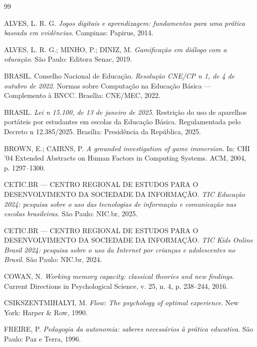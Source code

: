 \documentclass[11pt,a4paper]{article}
\begin{document}
\begin{thebibliography}{99}
\small

ALVES, L. R. G.
\emph{Jogos digitais e aprendizagem: fundamentos para uma pr\'atica baseada em evid\^encias}.
Campinas: Papirus, 2014.

ALVES, L. R. G.; MINHO, P.; DINIZ, M.
\emph{Gamifica\c{c}\~ao em di\'alogo com a educa\c{c}\~ao}.
S\~ao Paulo: Editora Senac, 2019.

BRASIL. Conselho Nacional de Educa\c{c}\~ao.
\emph{Resolu\c{c}\~ao CNE/CP n\textordmasculine{} 1, de 4 de outubro de 2022}. Normas sobre Computa\c{c}\~ao na Educa\c{c}\~ao B\'asica --- Complemento \`a BNCC.
Bras\'ilia: CNE/MEC, 2022.

BRASIL.
\emph{Lei n\textordmasculine{} 15.100, de 13 de janeiro de 2025}. Restri\c{c}\~ao do uso de aparelhos port\'ateis por estudantes em escolas da Educa\c{c}\~ao B\'asica. Regulamentada pelo Decreto n\textordmasculine{} 12.385/2025.
Bras\'ilia: Presid\^encia da Rep\'ublica, 2025.

BROWN, E.; CAIRNS, P.
\emph{A grounded investigation of game immersion}.
In: CHI '04 Extended Abstracts on Human Factors in Computing Systems. ACM, 2004, p. 1297--1300.

CETIC.BR --- CENTRO REGIONAL DE ESTUDOS PARA O DESENVOLVIMENTO DA SOCIEDADE DA INFORMA\c{C}\~AO.
\emph{TIC Educa\c{c}\~ao 2024: pesquisa sobre o uso das tecnologias de informa\c{c}\~ao e comunica\c{c}\~ao nas escolas brasileiras}.
S\~ao Paulo: NIC.br, 2025.

CETIC.BR --- CENTRO REGIONAL DE ESTUDOS PARA O DESENVOLVIMENTO DA SOCIEDADE DA INFORMA\c{C}\~AO.
\emph{TIC Kids Online Brasil 2024: pesquisa sobre o uso da Internet por crian\c{c}as e adolescentes no Brasil}.
S\~ao Paulo: NIC.br, 2024.

COWAN, N.
\emph{Working memory capacity: classical theories and new findings}.
Current Directions in Psychological Science, v. 25, n. 4, p. 238--244, 2016.

CSIKSZENTMIHALYI, M.
\emph{Flow: The psychology of optimal experience}.
New York: Harper \& Row, 1990.

FREIRE, P.
\emph{Pedagogia da autonomia: saberes necess\'arios \`a pr\'atica educativa}.
S\~ao Paulo: Paz e Terra, 1996.


\end{thebibliography}
\end{document}
